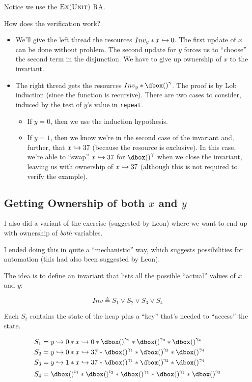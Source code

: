 Notice we use the $\textsc{Ex}(\textsc{Unit})$ RA.


How does the verification work?
\begin{itemize}
\item We'll give the left thread  the resources $Inv_y * x \hookrightarrow 0$. The first update of $x$ can be done without problem. The second update for $y$ forces us to ``choose'' the second term in the disjunction. We have to give up ownership of $x$ to the invariant.

\item The right thread gets the resources $Inv_y * \ownr{()}{\gamma}$. The proof is by Lob induction (since the function is recursive). There are two cases to consider, induced by the test of $y$'s value in \texttt{repeat}.

\begin{itemize}
\item If $y = 0$, then we use the induction hypothesis.

\item If $y = 1$, then we know we're in the second case of the invariant and, further, that $x \hookrightarrow 37$ (because the resource is exclusive). In this case, we're able to ``swap'' $x \hookrightarrow 37$ for $\ownr{()}{\gamma}$ when we close the invariant, leaving us with ownership of $x \hookrightarrow 37$ (although this is not required to verify the example).
\end{itemize}

\end{itemize}

\subsection{Getting Ownership of both $x$ and $y$}

I also did a variant of the exercise (suggested by Leon) where we want to end up with ownership of \emph{both} variables.

I ended doing this in quite a ``mechanistic'' way, which suggests possibilities for automation (this had also been suggested by Leon).

The idea is to define an invariant that lists all the possible ``actual'' values of $x$ and $y$:

\[ Inv \triangleq S_1 \lor S_2 \lor S_3 \lor S_4 \]

Each $S_i$ contains the state of the heap plus a ``key'' that's needed to ``access'' the state.

\begin{align*}
S_1 &= \pointsto{y}{0} * \pointsto{x}{0} * \ownr{()}{\gamma_2} *  \ownr{()}{\gamma_3} *  \ownr{()}{\gamma_4} \\
S_2 &= \pointsto{y}{0} * \pointsto{x}{37} * \ownr{()}{\gamma_1} *  \ownr{()}{\gamma_3} *  \ownr{()}{\gamma_4} \\
S_3 &= \pointsto{y}{1} * \pointsto{x}{37} * \ownr{()}{\gamma_1} *  \ownr{()}{\gamma_2} *  \ownr{()}{\gamma_4} \\
S_4  &= \ownr{()}{t_1} * \ownr{()}{t_2} * \ownr{()}{\gamma_1} *  \ownr{()}{\gamma_2} *  \ownr{()}{\gamma_3} \\
\end{align*}

